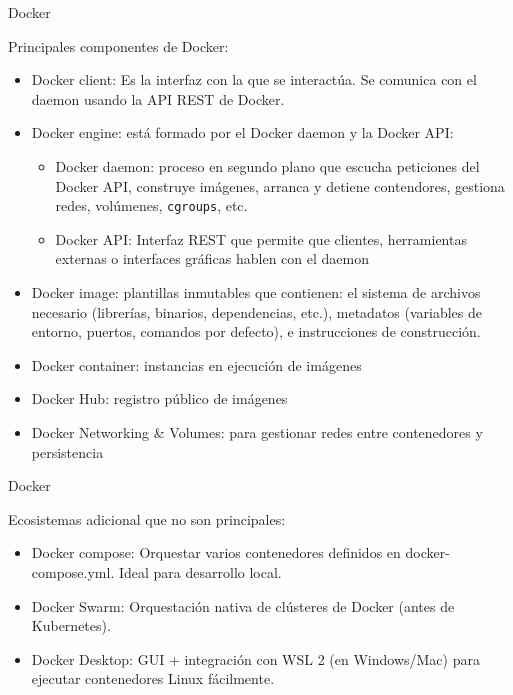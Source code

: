 \documentclass{beamer}
\begin{document}
\begin{frame}{Docker}

Principales componentes de Docker:
\begin{itemize}
    \item Docker client: Es la interfaz con la que se interactúa. Se comunica con el daemon usando la API REST de Docker.
    \item Docker engine: está formado por el Docker daemon y la Docker API:
        \begin{itemize}
            \item Docker daemon: proceso en segundo plano que escucha peticiones del Docker API, construye imágenes, arranca y detiene contendores, gestiona redes, volúmenes, \texttt{cgroups}, etc.
            \item Docker API: Interfaz REST que permite que clientes, herramientas externas o interfaces gráficas hablen con el daemon
        \end{itemize}
        
    \item Docker image: plantillas inmutables que contienen: el sistema de archivos necesario (librerías, binarios, dependencias, etc.), metadatos (variables de entorno, puertos, comandos por defecto), e instrucciones de construcción.
    \item Docker container: instancias en ejecución de imágenes
    \item Docker Hub: registro público de imágenes
    \item Docker Networking \& Volumes: para gestionar redes entre contenedores y persistencia
\end{itemize}
    
\end{frame}

\begin{frame}{Docker}

Ecosistemas adicional que no son principales:
\begin{itemize}
    \item Docker compose: Orquestar varios contenedores definidos en docker-compose.yml. Ideal para desarrollo local.
    \item Docker Swarm: Orquestación nativa de clústeres de Docker (antes de Kubernetes).
    \item Docker Desktop: GUI + integración con WSL 2 (en Windows/Mac) para ejecutar contenedores Linux fácilmente.
\end{itemize}
    
\end{frame}
\end{document}
